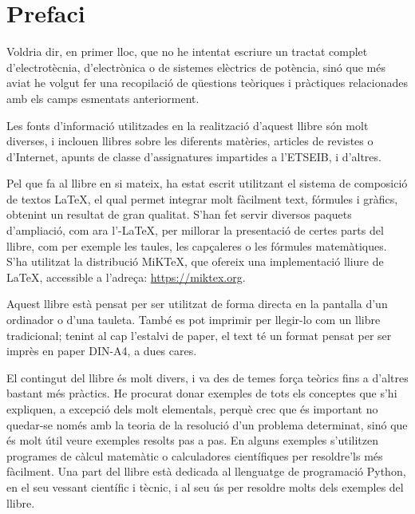 \chapter*{Prefaci} 

   Voldria dir, en primer lloc, que no he intentat escriure un tractat complet
   d'electrotècnia, d'electrònica o de sistemes elèctrics de potència, sinó que més aviat
   he volgut
   fer una recopilació de qüestions teòriques i pràctiques relacionades amb els camps esmentats
   anteriorment.

   Les fonts d'informació utilitzades en la realització d'aquest llibre són molt diverses,
   i inclouen llibres sobre les diferents matèries, articles de revistes o d'Internet,
   apunts de classe d'assignatures impartides a l'ETSEIB, i d'altres.

   Pel que fa al llibre en si mateix, ha estat escrit utilitzant el sistema de composició de
   textos \LaTeX, el qual
   permet integrar molt fàcilment text, fórmules i gràfics, obtenint un resultat de
   gran qualitat. S'han fet servir diversos paquets d'ampliació, com ara
   l'\AmS-\LaTeX,
   per millorar la presentació de certes parts del
   llibre, com per exemple les taules, les capçaleres o les fórmules matemàtiques. S'ha utilitzat la distribució MiK\TeX, que ofereix una implementació lliure de \LaTeX{}, accessible a l'adreça: \href{https://miktex.org/}{https:/\!\!/miktex.org}.

   Aquest llibre està pensat per  ser utilitzat  de forma directa en la pantalla d'un
   ordinador o d'una tauleta. També es pot imprimir per  llegir-lo com un llibre tradicional;  tenint al cap l'estalvi de paper, el text
   té un format pensat per  ser imprès en paper DIN-A4, a dues cares.

    El contingut del llibre és molt divers, i va des de temes força teòrics fins a
    d'altres bastant més pràctics. He procurat donar exemples de tots els conceptes
    que s'hi expliquen, a excepció dels molt elementals, perquè crec que és important
     no quedar-se només amb la teoria de  la resolució d'un problema determinat, sinó que
     és molt útil veure exemples resolts pas a pas. En alguns exemples s'utilitzen programes de càlcul matemàtic o calculadores científiques per  resoldre'ls  més fàcilment. Una part  del llibre està dedicada al llenguatge de programació Python, en el seu vessant científic i tècnic, i al seu ús  per resoldre molts dels exemples del llibre.
     
